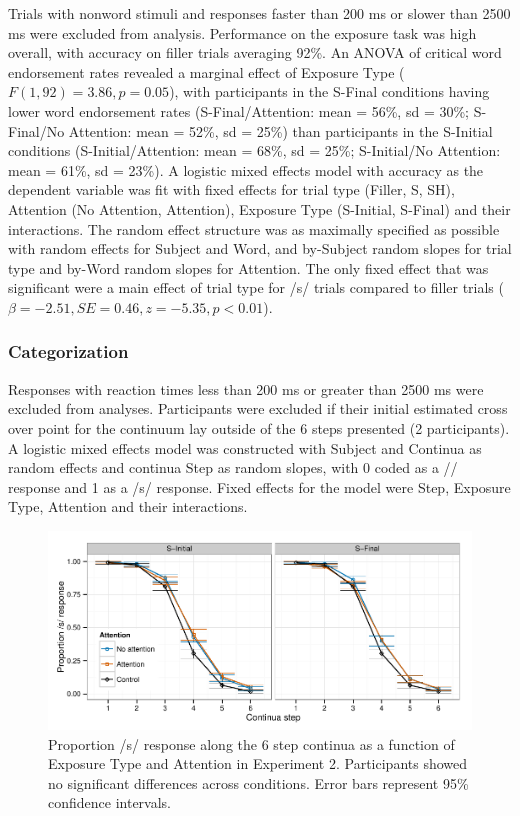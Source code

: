 \documentclass[11pt]{article}\usepackage[]{graphicx}\usepackage[]{color}
\begin{document}
Trials with nonword stimuli and responses faster than 200 ms or slower than 2500 ms were excluded from analysis. 
Performance on the exposure task was high overall, with accuracy on filler trials averaging 92\%.  
An ANOVA of critical word endorsement rates revealed a marginal effect of Exposure Type ($F(1,92) = 3.86, p = 0.05$), with participants in the S-Final conditions having lower word endorsement rates (S-Final/Attention: mean = 56\%, sd = 30\%; S-Final/No Attention: mean = 52\%, sd = 25\%) than participants in the S-Initial conditions (S-Initial/Attention: mean = 68\%, sd = 25\%; S-Initial/No Attention: mean = 61\%, sd = 23\%).
A logistic mixed effects model with accuracy as the dependent variable was fit with fixed effects for trial type (Filler, S, SH), Attention (No Attention, Attention), Exposure Type (S-Initial, S-Final) and their interactions. 
The random effect structure was as maximally specified as possible with random effects for Subject and Word, and by-Subject random slopes for trial type and by-Word random slopes for Attention. 
The only fixed effect that was significant were a main effect of trial type for /s/ trials compared to filler trials ($\beta = -2.51, SE = 0.46, z = -5.35, p < 0.01$).

\subsubsection{Categorization}

Responses with reaction times less than 200 ms or greater than 2500 ms were excluded from analyses. 
Participants were excluded if their initial estimated cross over point for the continuum lay outside of the 6 steps presented (2 participants).  
A logistic mixed effects model was constructed with Subject and Continua as random effects and continua Step as random slopes, with 0 coded as a /\textesh/ response and 1 as a /s/ response.  Fixed effects for the model were Step, Exposure Type, Attention and their interactions.

\begin{figure}[!ht]
\caption{Proportion /s/ response along the 6 step continua as a function of Exposure Type and Attention in Experiment 2.  Participants showed no significant differences across conditions. Error bars represent 95\% confidence intervals.}
\label{fig:exp2categ}
\begin{center}
\includegraphics[width=\textwidth]{graphs/exp2_categresults}
\end{center}
\end{figure}
\end{document}
